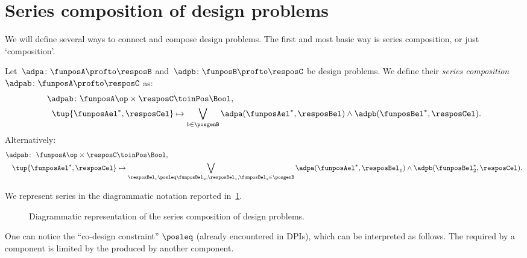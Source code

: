 \section{Series composition of design problems}
We will define several ways to connect and compose design problems. The first and most basic way is series composition, or just `composition'.

\begin{definition}
  \label{def:dp-series}
  Let~$\adpa \colon  \funposA \profto \resposB$ and~$\adpb \colon \funposB \profto \resposC$ be design problems.
  We define their \emph{series composition}~$\adpab \colon  \funposA \profto \resposC$ as:
  \begin{equation}
    \label{eq:composition2}
    \begin{aligned}
    \adpab
      \colon \funposA\op \times \resposC & \toinPos  \Bool, \\
      \tup{\funposAel^*, \resposCel} &\mapsto \bigvee_{b\in \posgenB} \adpa(\funposAel^*,\resposBel) \wedge \adpb(\funposBel^*,\resposCel).
    \end{aligned}
  \end{equation}
  Alternatively:
  \begin{equation}
    \begin{aligned}
      \label{eq:composition}
      \adpab  \colon \ \funposA\op \times \resposC & \toinPos  \Bool,  \\
      \tup{\funposAel^*, \resposCel} &\mapsto \bigvee_{\resposBel_1\posleq\funposBel_2, \resposBel_1,\funposBel_2\in \posgenB} \adpa(\funposAel^*,\resposBel_1) \wedge \adpb(\funposBel_2^*,\resposCel).
    \end{aligned}
  \end{equation}
\end{definition}
We represent series in the diagrammatic notation reported in~\cref{fig:compositiondiagram}.

\begin{figure}[h!]
  \begin{center}
  \end{center}
  \caption{Diagrammatic representation of the series composition of design problems. \label{fig:compositiondiagram}}
\end{figure}

One can notice the ``co-design constraint'' $\posleq$ (already encountered in DPIs), which can be interpreted as follows.
The  required by a component is limited by the  produced by another component.


